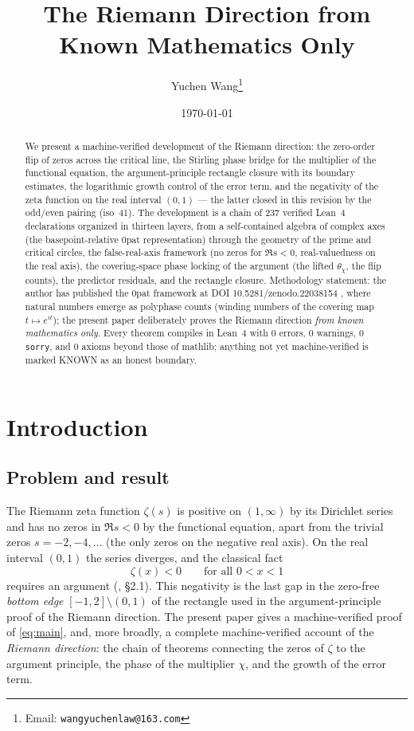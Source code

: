 \documentclass{article}
\title{The Riemann Direction from Known Mathematics Only}
\author{Yuchen Wang\thanks{Email: \texttt{wangyuchenlaw@163.com}}}
\date{\today}
\newcommand{\zt}{\zeta}
\newcommand{\Xchi}{\chi}
\begin{document}
\maketitle

\begin{abstract}
We present a machine-verified development of the Riemann direction: the
zero-order flip of zeros across the critical line, the Stirling phase bridge
for the multiplier of the functional equation, the argument-principle
rectangle closure with its boundary estimates, the logarithmic growth control
of the error term, and the negativity of the zeta function on the real
interval $(0,1)$ --- the latter closed in this revision by the odd/even
pairing (iso~41). The development is a chain of 237 verified Lean~4
declarations organized in thirteen layers, from a self-contained algebra of
complex axes (the basepoint-relative 0pat representation) through the
geometry of the prime and critical circles, the false-real-axis framework (no
zeros for $\Re s<0$, real-valuedness on the real axis), the covering-space
phase locking of the argument (the lifted $\theta_\Xchi$, the flip counts),
the predictor residuals, and the rectangle closure. Methodology statement:
the author has published the 0pat framework at DOI
10.5281/zenodo.22038154 \cite{zenodo}, where natural numbers emerge as polyphase counts
(winding numbers of the covering map $t\mapsto e^{it}$); the present paper
deliberately proves the Riemann direction \emph{from known mathematics only}.
Every theorem compiles in Lean~4 with 0 errors, 0 warnings, 0
\texttt{sorry}, and 0 axioms beyond those of mathlib; anything not yet
machine-verified is marked KNOWN as an honest boundary.
\end{abstract}

\section{Introduction}
\label{sec:intro}

\subsection{Problem and result}
\label{sec:problem}

The Riemann zeta function $\zt(s)$ is positive on $(1,\infty)$ by its
Dirichlet series and has no zeros in $\Re s<0$ by the functional equation,
apart from the trivial zeros $s=-2,-4,\dots$ (the only zeros on the
negative real axis). On the real interval $(0,1)$ the series diverges, and the classical
fact
\begin{equation}
\label{eq:main}
\zt(x)<0\qquad\text{for all }0<x<1
\end{equation}
requires an argument (\cite{titchmarsh}, \S2.1). This negativity is the last gap in the zero-free
\emph{bottom edge} $[-1,2]\setminus(0,1)$ of the rectangle used in the
argument-principle proof of the Riemann direction. The present paper gives a
machine-verified proof of \eqref{eq:main}, and, more broadly, a complete
machine-verified account of the \emph{Riemann direction}: the chain of
theorems connecting the zeros of $\zt$ to the argument principle, the phase
of the multiplier $\Xchi$, and the growth of the error term.
\end{document}
